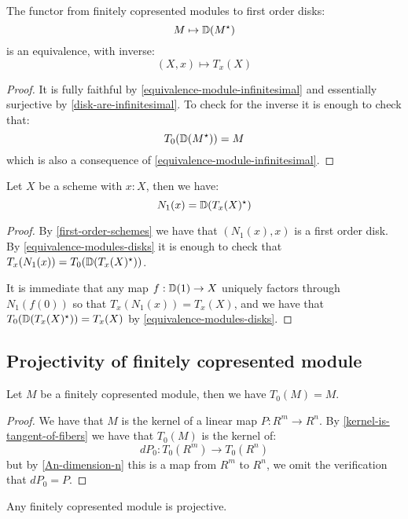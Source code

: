 \begin{lemma}\label{equivalence-modules-disks}
The functor from finitely copresented modules to first order disks:
\[M\mapsto \mathbb{D}(M^\star)\]
is an equivalence, with inverse:
\[(X,x)\mapsto T_x(X)\]
\end{lemma}

\begin{proof}
It is fully faithful by \cref{equivalence-module-infinitesimal} and essentially surjective by \cref{disk-are-infinitesimal}. To check for the inverse it is enough to check that:
\[T_0(\mathbb{D}(M^\star)) = M\]
which is also a consequence of \cref{equivalence-module-infinitesimal}.
\end{proof}

\begin{lemma}\label{duality-infinitesimal-tangent}
Let $X$ be a scheme with $x:X$, then we have:
\[N_1(x) = \mathbb{D}(T_x(X)^\star)\]
\end{lemma}

\begin{proof}
By \cref{first-order-schemes} we have that $(N_1(x),x)$ is a first order disk. By \cref{equivalence-modules-disks} it is enough to check that $T_x(N_1(x)) = T_0(\mathbb{D}(T_x(X)^\star))$. 

It is immediate that any map $f:\mathbb{D}(1)\to X$ uniquely factors through $N_1(f(0))$ so that $T_x(N_1(x)) = T_x(X)$, and we have that $T_0(\mathbb{D}(T_x(X)^\star)) = T_x(X)$ by \cref{equivalence-modules-disks}.
\end{proof}


\subsection{Projectivity of finitely copresented module}

\begin{lemma}\label{tangent-copresented-modules}
Let $M$ be a finitely copresented module, then we have $T_0(M) = M$.
\end{lemma}

\begin{proof}
We have that $M$ is the kernel of a linear map $P:R^m\to R^n$. By \cref{kernel-is-tangent-of-fibers} we have that $T_0(M)$ is the kernel of:
\[dP_0:T_0(R^m)\to T_0(R^n)\]
but by \cref{An-dimension-n} this is a map from $R^m$ to $R^n$, we omit the verification that $dP_0 = P$.
\end{proof}

\begin{lemma}
Any finitely copresented module is projective.
\end{lemma}

